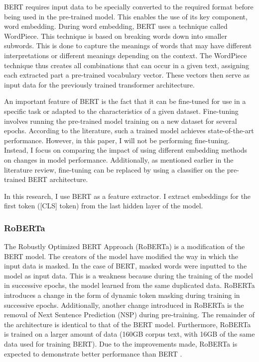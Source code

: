 BERT requires input data to be specially converted to the required format before being used in the pre-trained model. This enables the use of its key component, word embedding. During word embedding, BERT uses a technique called WordPiece. This technique is based on breaking words down into smaller subwords. This is done to capture the meanings of words that may have different interpretations or different meanings depending on the context. The WordPiece technique thus creates all combinations that can occur in a given text, assigning each extracted part a pre-trained vocabulary vector. These vectors then serve as input data for the previously trained transformer architecture.

An important feature of BERT is the fact that it can be fine-tuned for use in a specific task or adapted to the characteristics of a given dataset. Fine-tuning involves running the pre-trained model training on a new dataset for several epochs. According to the literature, such a trained model achieves state-of-the-art performance. However, in this paper, I will not be performing fine-tuning. Instead, I focus on comparing the impact of using different embedding methods on changes in model performance. Additionally, as mentioned earlier in the literature review, fine-tuning can be replaced by using a classifier on the pre-trained BERT architecture.

In this research, I use BERT as a feature extractor. I extract embeddings for the first token ([CLS] token) from the last hidden layer of the model.

\subsubsection{RoBERTa}
The Robustly Optimized BERT Approach (RoBERTa) is a modification of the BERT model. The creators of the model have modified the way in which the input data is masked. In the case of BERT, masked words were inputted to the model as input data. This is a weakness because during the training of the model in successive epochs, the model learned from the same duplicated data. RoBERTa introduces a change in the form of dynamic token masking during training in successive epochs. Additionally, another change introduced in RoBERTa is the removal of Next Sentence Prediction (NSP) during pre-training. The remainder of the architecture is identical to that of the BERT model.
Furthermore, RoBERTa is trained on a larger amount of data (160GB corpus text, with 16GB of the same data used for training BERT).
Due to the improvements made, RoBERTa is expected to demonstrate better performance than BERT \autocite{Liu2019}.

